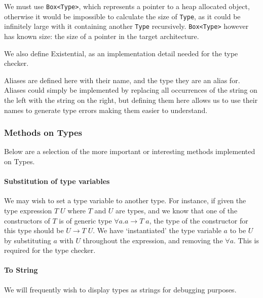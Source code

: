 We must use \verb|Box<Type>|, which represents a pointer to a heap allocated object, otherwise it would be impossible to calculate the size of \verb|Type|, as it could be infinitely large with it containing another \verb|Type| recursively. \verb|Box<Type>| however has known size: the size of a pointer in the target architecture. 

We also define Existential, as an implementation detail needed for the type checker. 

Aliases are defined here with their name, and the type they are an alias for. Aliases could simply be implemented by replacing all occurrences of the string on the left with the string on the right, but defining them here allows us to use their names to generate type errors making them easier to understand. 

\subsubsection{Methods on Types}
Below are a selection of the more important or interesting methods implemented on Types.

\paragraph{Substitution of type variables} We may wish to set a type variable to another type. For instance, if given the type expression \(T \; U\) where \(T\) and \(U\) are types, and we know that one of the constructors of \(T\) is of generic type \(\forall a.a \rightarrow T \; a\), the type of the constructor for this type should be \(U \rightarrow T \; U\). We have `instantiated' the type variable \(a\) to be \(U\) by substituting \(a\) with \(U\) throughout the expression, and removing the \(\forall a\). This is required for the type checker. 

\paragraph{To String} We will frequently wish to display types as strings for debugging purposes. 

\newpage
